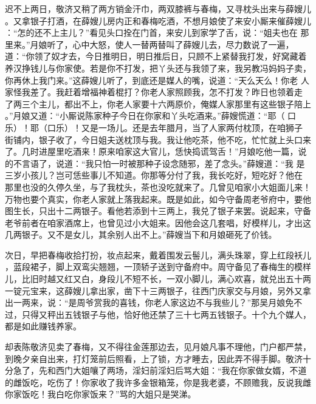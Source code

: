 迟不上两日，敬济又稍了两方销金汗巾，两双膝裤与春梅，又寻枕头出来与薛嫂儿
。又拿银子打酒，在薛嫂儿房内正和春梅吃酒，不想月娘使了来安小厮来催薛嫂儿
：“怎的还不上主儿？”看见头口拴在门首，来安儿到家学了舌，说：“姐夫也在
那里来。”月娘听了，心中大怒，使人一替两替叫了薛嫂儿去，尽力数说了一遍，
道：“你领了奴才去，今日推明日，明日推后日，只顾不上紧替我打发，好窝藏着
养汉挣钱儿与你家使。若是你不打发，把丫头还与我领了来，我另教冯妈妈子卖，
你再休上我门来。”这薛嫂儿听了，到底还是媒人的嘴，说道：“天么天么！你老
人家怪我差了。我赶着增福神着棍打？你老人家照顾我，怎不打发？昨日也领着走
了两三个主儿，都出不上，你老人家要十六两原价，俺媒人家那里有这些银子陪上
。”月娘又道：“小厮说陈家种子今日在你家和丫头吃酒来。”薛嫂慌道：“耶（
口乐）！耶（口乐）！又是一场儿。还是去年腊月，当了人家两付枕顶，在咱狮子
街铺内，银子收了，今日姐夫送枕顶与我。我让他吃茶，他不吃，忙忙就上头口来
了。几时进屋里吃酒来！原来咱家这大官儿，恁快捣谎驾舌！”月娘吃他一篇，说
的不言语了，说道：“我只怕一时被那种子设念随邪，差了念头。”薛嫂道：“我
是三岁小孩儿？岂可恁些事儿不知道。你那等分付了我，我长吃好，短吃好？他在
那里也没的久停久坐，与了我枕头，茶也没吃就来了。几曾见咱家小大姐面儿来！
万物也要个真实，你老人家就上落我起来。既是如此，如今守备周老爷府中，要他
图生长，只出十二两银子。看他若添到十三两上，我兑了银子来罢。说起来，守备
老爷前者在咱家酒席上，也曾见过小大姐来。因他会这几套唱，好模样儿，才出这
几两银子。又不是女儿，其余别人出不上。”薛嫂当下和月娘砸死了价钱。

次日，早把春梅收拾打扮，妆点起来，戴着围发云髻儿，满头珠翠，穿上红段袄儿
，蓝段裙子，脚上双鸾尖翘翘，一顶轿子送到守备府中。周守备见了春梅生的模样
儿，比旧时越又红又白，身段儿不短不长，一双小脚儿，满心欢喜，就兑出五十两
一锭元宝来，这薛嫂儿拿出家，凿下十三两银子，往西门庆家交与月娘，另外又拿
出一两来，说：“是周爷赏我的喜钱，你老人家这边不与我些儿？”那吴月娘免不
过，只得又秤出五钱银子与他，恰好他还禁了三十七两五钱银子。十个九个媒人，
都是如此赚钱养家。

却表陈敬济见卖了春梅，又不得往金莲那边去，见月娘凡事不理他，门户都严禁，
到晚夕亲自出来，打灯笼前后照看，上了锁，方才睡去，因此弄不得手脚。敬济十
分急了，先和西门大姐嚷了两场，淫妇前淫妇后骂大姐：“我在你家做女婿，不道
的雌饭吃，吃伤了！你家收了我许多金银箱笼，你是我老婆，不顾赡我，反说我雌
你家饭吃！我白吃你家饭来？”骂的大姐只是哭涕。

